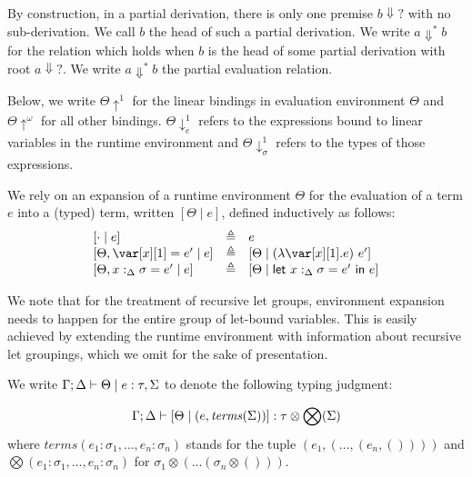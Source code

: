 \documentclass[acmsmall,review,anonymous,screen]{acmart}
\newcommand{\llet}[2]{\mathsf{let}~#1~\mathsf{in}~#2}
\begin{document}
 By construction, in a partial derivation, there is only one premise
 $b\Downarrow?$ with no sub-derivation. We call $b$ the head of such a
 partial derivation.
We write $a \Downarrow^* b$ for the relation which holds when $b$ is
the head of some partial derivation with root $a \Downarrow?$.  We
write $a \Downarrow^* b$  the partial evaluation relation.
 
Below, we write $\Theta {\uparrow^1}$ for the linear bindings in evaluation
environment $\Theta$ and $\Theta {\uparrow^\omega}$ for all other bindings.
$\Theta\downarrow^1_e$ refers to the expressions bound to linear variables in
the runtime environment and $\Theta\downarrow^1_\sigma$ refers to the types of
those expressions.



 
 \begin{definition}
   We rely on an expansion of a runtime environment $\Theta$ for the evaluation of a term $e$ into a (typed) term, written $[\Theta \mid e]$, defined inductively as follows:
   \[
     \begin{array}{lcl}
       \left[ \cdot \mid e \right] & \triangleq & e\\
       \left[ \Theta , \xl = e' \mid e \right] & \triangleq  & [\Theta \mid (\lambda \xl . e)~e']\\
       \left[\Theta , x:_\Delta \sigma = e' \mid e \right] & \triangleq & [\Theta \mid \llet{x:_\Delta \sigma = e'}{e}]
    \end{array}
   \]
 \end{definition}


We note that for the treatment of recursive let groups, environment
expansion needs to happen for the entire group of let-bound
variables. This is easily achieved by extending the runtime
environment with information about recursive let groupings, which we
omit for the sake of presentation.
 
 \begin{definition}
   We write $\Gamma;\Delta \vdash \Theta \mid e : \tau,\Sigma$ to denote the following typing judgment:

   \[
\Gamma ; \Delta \vdash [ \Theta \mid (e,\mathit{terms}(\Sigma))] : \tau \otimes \bigotimes(\Sigma)
   \]
   where $\mathit{terms}(e_1 : \sigma_1 , \dots , e_n : \sigma_n)$ stands for the tuple $(e_1 ,( \dots , (e_n , ())))$ and
   $\bigotimes(e_1 : \sigma_1 , \dots , e_n : \sigma_n)$ for $\sigma_1 \otimes ( \dots (\sigma_n \otimes ()))$.
 \end{definition}
\end{document}
